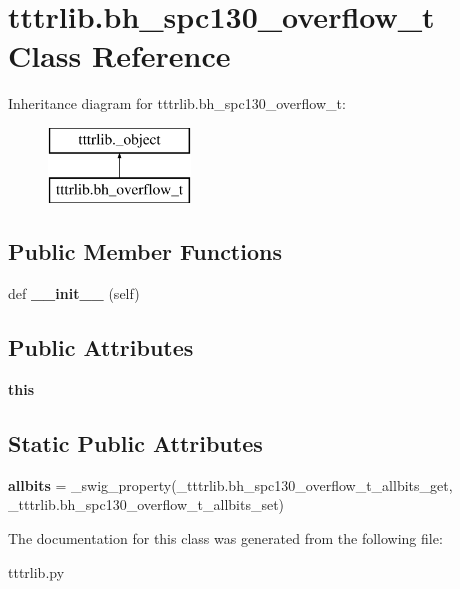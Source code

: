 \hypertarget{classtttrlib_1_1bh__spc130__overflow__t}{}\section{tttrlib.\+bh\+\_\+spc130\+\_\+overflow\+\_\+t Class Reference}
\label{classtttrlib_1_1bh__spc130__overflow__t}
Inheritance diagram for tttrlib.\+bh\+\_\+spc130\+\_\+overflow\+\_\+t\+:\begin{figure}[H]
\begin{center}
\leavevmode
\includegraphics[height=2.000000cm]{classtttrlib_1_1bh__spc130__overflow__t}
\end{center}
\end{figure}
\subsection*{Public Member Functions}
\begin{DoxyCompactItemize}
\item 
\mbox{\label{classtttrlib_1_1bh__spc130__overflow__t_a855cdfdb5f6f5d139c36c0d61e6d952a}} 
def {\bfseries \+\_\+\+\_\+init\+\_\+\+\_\+} (self)
\end{DoxyCompactItemize}
\subsection*{Public Attributes}
\begin{DoxyCompactItemize}
\item 
\mbox{\label{classtttrlib_1_1bh__spc130__overflow__t_a9206b775dbb3d75c1ee015686ee3b0b0}} 
{\bfseries this}
\end{DoxyCompactItemize}
\subsection*{Static Public Attributes}
\begin{DoxyCompactItemize}
\item 
\mbox{\label{classtttrlib_1_1bh__spc130__overflow__t_a734d89a6aa7a85d1efb70f5e1293d2d4}} 
{\bfseries allbits} = \+\_\+swig\+\_\+property(\+\_\+tttrlib.\+bh\+\_\+spc130\+\_\+overflow\+\_\+t\+\_\+allbits\+\_\+get, \+\_\+tttrlib.\+bh\+\_\+spc130\+\_\+overflow\+\_\+t\+\_\+allbits\+\_\+set)
\end{DoxyCompactItemize}


The documentation for this class was generated from the following file\+:\begin{DoxyCompactItemize}
\item 
tttrlib.\+py\end{DoxyCompactItemize}
